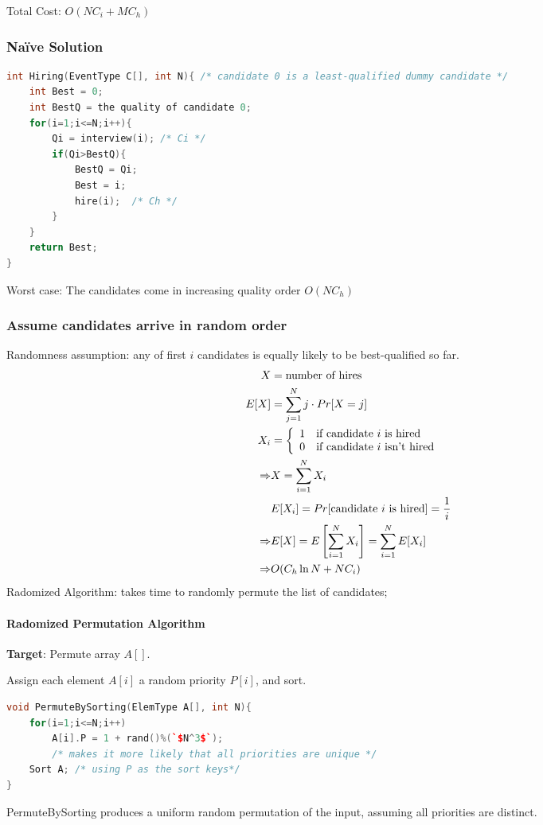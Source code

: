 Total Cost: $O(NC_i + MC_h)$

\subsubsection{Naïve Solution}
\begin{lstlisting}[language={c++}]
int Hiring(EventType C[], int N){ /* candidate 0 is a least-qualified dummy candidate */  
    int Best = 0;
    int BestQ = the quality of candidate 0;
    for(i=1;i<=N;i++){
        Qi = interview(i); /* Ci */
        if(Qi>BestQ){
            BestQ = Qi;
            Best = i;
            hire(i);  /* Ch */
        }
    }
    return Best;
}
\end{lstlisting}
Worst case: The candidates come in increasing quality order $O(NC_h)$

\subsubsection{Assume candidates arrive in random order}
Randomness assumption: any of first $i$ candidates is equally likely to be best-qualified so far. 
\begin{align*}
    X &= \text{number of hires}\\
    E[X]&=\sum_{j=1}^N j\cdot Pr[X=j]\\
    X_i&=\left\{ \begin{array}[c]{ll}
        1 & \text{if candidate $i$ is hired}\\
        0 & \text{if candidate $i$ isn't hired}
    \end{array} \right.\\
    \Rightarrow&X=\sum_{i=1}^N X_i \\
    & E[X_i]=Pr[\text{candidate $i$ is hired}]=\frac{1}{i}\\
    \Rightarrow&E[X]=E\left[ \sum_{i=1}^NX_i \right]=\sum_{i=1}^N E[X_i]\\
    \Rightarrow& O(C_h \ln N + N C_i)
\end{align*}
Radomized Algorithm: takes time to randomly permute the list of candidates;

\paragraph{Radomized Permutation Algorithm}\quad 

\textbf{Target}: Permute array $A[]$. 

Assign each element $A[ i ]$ a random priority $P[ i ]$, and sort. 
\begin{lstlisting}[language={c++}]
void PermuteBySorting(ElemType A[], int N){
    for(i=1;i<=N;i++)
        A[i].P = 1 + rand()%(`$N^3$`); 
        /* makes it more likely that all priorities are unique */
    Sort A; /* using P as the sort keys*/
}
\end{lstlisting}
\begin{claim}
    PermuteBySorting produces a uniform random permutation of the input, assuming all priorities are distinct.
\end{claim}

